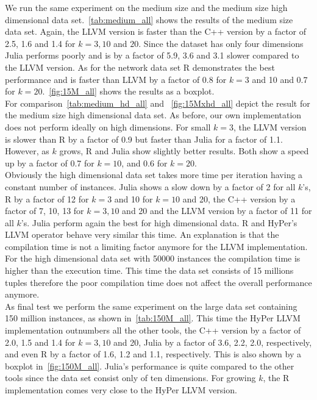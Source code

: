 We run the same experiment on the medium size and the medium size high dimensional data set.~\autoref{tab:medium_all} shows the results of the medium size data set. Again, the LLVM version is faster than the C++ version by a factor of 2.5, 1.6 and 1.4 for $k = 3, 10$ and $20$. Since the dataset has only four dimensions Julia performs poorly and is by a factor of 5.9, 3.6 and 3.1 slower compared to the LLVM version. As for the network data set R demonstrates the best performance and is faster than LLVM by a factor of 0.8 for $k = 3$ and 10 and 0.7 for $k = 20$.~\autoref{fig:15M_all} shows the results as a boxplot.
\\
For comparison~\autoref{tab:medium_hd_all} and ~\autoref{fig:15Mxhd_all} depict the result for the medium size high dimensional data set. As before, our own implementation does not perform ideally on high dimensions. For small $k = 3$, the LLVM version is slower than R by a factor of 0.9 but faster than Julia for a factor of 1.1. However, as $k$ grows, R and Julia show slightly better results. Both show a speed up by a factor of 0.7 for $k = 10$, and 0.6 for $k = 20$. 
\\
Obviously the high dimensional data set takes more time per iteration having a constant number of instances. Julia shows a slow down by a factor of 2 for all $k$'s, R by a factor of 12 for $k = 3$ and 10 for $k = 10$ and 20, the C++ version by a factor of 7, 10, 13 for $k = 3, 10$ and 20 and the LLVM version by a factor of 11 for all $k$'s. Julia perform again the best for high dimensional data. R and HyPer's LLVM operator behave very similar this time. An explanation is that the compilation time is not a limiting factor anymore for the LLVM implementation. For the high dimensional data set with 50000 instances the compilation time is higher than the execution time. This time the data set consists of 15 millions tuples therefore the poor compilation time does not affect the overall performance anymore.
\\
As final test we perform the same experiment on the large data set containing 150 million instances, as shown in~\autoref{tab:150M_all}. This time the HyPer LLVM implementation outnumbers all the other tools, the C++ version by a factor of 2.0, 1.5 and 1.4 for $k = 3, 10$ and 20, Julia by a factor of 3.6, 2.2, 2.0, respectively, and even R by a factor of 1.6, 1.2 and 1.1, respectively. This is also shown by a boxplot in~\autoref{fig:150M_all}. Julia's performance is quite compared to the other tools since the data set consist only of ten dimensions. For growing $k$, the R implementation comes very close to the HyPer LLVM version.
